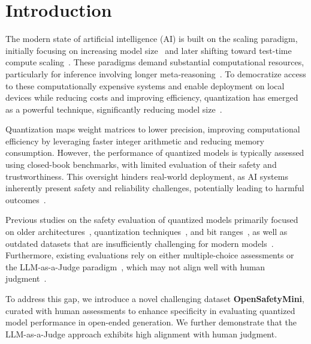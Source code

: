\section{Introduction}

The modern state of artificial intelligence (AI) is built on the scaling paradigm, initially focusing on increasing model size~\cite{hoffmann2022trainingcomputeoptimallargelanguage} and later shifting toward test-time compute scaling~\cite{snell2024scalingllmtesttimecompute,geiping2025scalingtesttimecomputelatent}. These paradigms demand substantial computational resources, particularly for inference involving longer meta-reasoning~\cite{gao2024metareasoninglargelanguage}. To democratize access to these computationally expensive systems and enable deployment on local devices while reducing costs and improving efficiency, quantization has emerged as a powerful technique, significantly reducing model size~\cite{lin2024awq,ashkboos2023towards}. 

Quantization maps weight matrices to lower precision, improving computational efficiency by leveraging faster integer arithmetic and reducing memory consumption. However, the performance of quantized models is typically assessed using closed-book benchmarks, with limited evaluation of their safety and trustworthiness. This oversight hinders real-world deployment, as AI systems inherently present safety and reliability challenges, potentially leading to harmful outcomes~\cite{zhang2023safetybench,ren2024safetywashing}. 

Previous studies on the safety evaluation of quantized models primarily focused on older architectures~\cite{li2024salad}, quantization techniques~\cite{xu2024beyond}, and bit ranges~\cite{belkhiter2024harmlevelbench}, as well as outdated datasets that are insufficiently challenging for modern models~\cite{liu2024evaluating,yang2024llmcbench}. Furthermore, existing evaluations rely on either multiple-choice assessments or the LLM-as-a-Judge paradigm~\cite{xu2024beyond}, which may not align well with human judgment~\cite{bavaresco2024llms}.

To address this gap, we introduce a novel challenging dataset \textbf{OpenSafetyMini}, curated with human assessments to enhance specificity in evaluating quantized model performance in open-ended generation. We further demonstrate that the LLM-as-a-Judge approach exhibits high alignment with human judgment.

